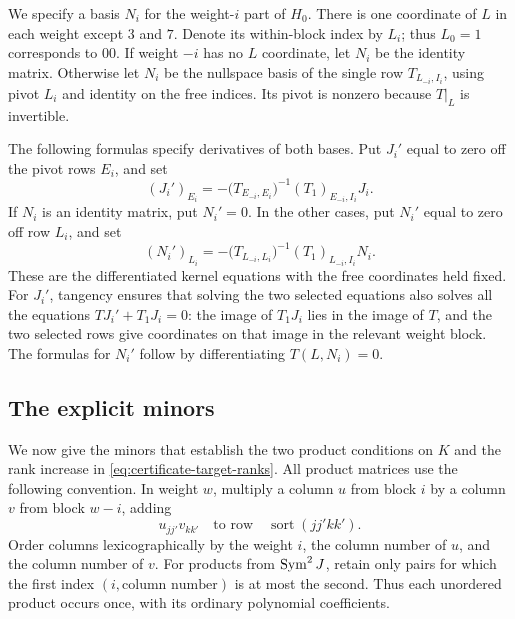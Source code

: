 We specify a basis $N_i$ for the weight-$i$ part of $H_0$.  There is
one coordinate of $L$ in each weight except $3$ and $7$.  Denote its
within-block index by $L_i$; thus $L_0=1$ corresponds to $00$.
If weight $-i$
has no $L$ coordinate, let $N_i$ be the identity matrix.  Otherwise
let $N_i$ be the nullspace basis of the single row $T_{L_{-i},I_i}$,
using pivot $L_i$ and identity on the free indices.  Its pivot is
nonzero because $T|_L$ is invertible.

The following formulas specify derivatives of both bases.  Put
$J_i'$ equal to zero off the pivot rows $E_i$, and set
\begin{equation}
 (J_i')_{E_i}=
 -\bigl(T_{E_{-i},E_i}\bigr)^{-1}
       (T_1)_{E_{-i},I_i}J_i.
 \label{eq:certificate-J-derivative}
\end{equation}
If $N_i$ is an identity matrix, put $N_i'=0$.  In the other cases,
put $N_i'$ equal to zero off row $L_i$, and set
\begin{equation}
 (N_i')_{L_i}=
 -\bigl(T_{L_{-i},L_i}\bigr)^{-1}
       (T_1)_{L_{-i},I_i}N_i.
 \label{eq:certificate-N-derivative}
\end{equation}
These are the differentiated kernel equations with the free
coordinates held fixed.  For $J_i'$, tangency ensures that solving
the two selected equations also solves all the equations
$TJ_i'+T_1J_i=0$: the image of $T_1J_i$ lies in the image of $T$,
and the two selected rows give coordinates on that image in the
relevant weight block.  The formulas for $N_i'$ follow by
differentiating $T(L,N_i)=0$.

\subsection{The explicit minors}
\label{subsec:certificate-minors}

We now give the minors that establish the two product conditions on
$K$ and the rank increase in
\eqref{eq:certificate-target-ranks}.  All product matrices use the
following convention.  In weight $w$, multiply a column $u$ from
block $i$ by a column $v$ from block $w-i$, adding
\[
 u_{jj'}v_{kk'}
 \quad\text{to row}\quad \operatorname{sort}(jj'kk').
\]
Order columns lexicographically by the weight $i$, the column number
of $u$, and the column number of $v$.  For products from
$\operatorname{Sym}^2J$, retain only pairs for which the first index
$(i,\text{column number})$ is at most the second.  Thus each
unordered product occurs once, with its ordinary polynomial
coefficients.


